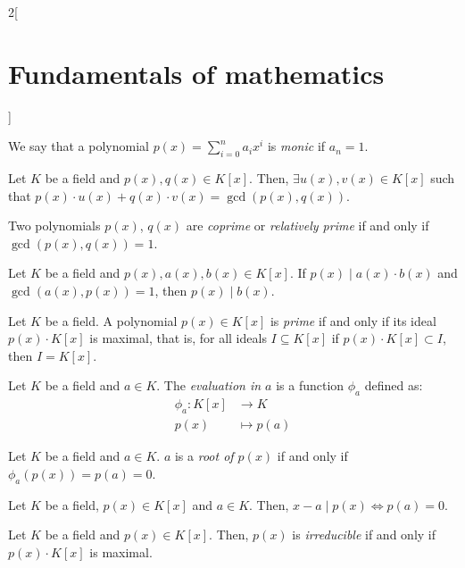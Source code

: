 \documentclass[../../../main.tex]{subfiles}
\begin{document}
\begin{multicols}{2}[\section{Fundamentals of mathematics}]
\begin{definition}
    \end{definition}
    \begin{definition}
        We say that a polynomial $p(x)=\sum_{i=0}^na_ix^i$ is \textit{monic} if $a_n=1$.
    \end{definition}
    \begin{theorem}
        Let $K$ be a field and $p(x),q(x)\in K[x]$. Then, $\exists u(x), v(x)\in K[x]$ such that $p(x)\cdot u(x)+q(x)\cdot v(x)=\gcd(p(x),q(x))$.
    \end{theorem}
    \begin{definition}
        Two polynomials $p(x)$, $q(x)$ are \textit{coprime} or \textit{relatively prime} if and only if $\gcd(p(x),q(x))=1$.
    \end{definition}
    \begin{theorem}
        Let $K$ be a field and $p(x),a(x),b(x)\in K[x]$. If $p(x)\mid a(x)\cdot b(x)$ and $\gcd(a(x),p(x))=1$, then $p(x)\mid b(x)$.
    \end{theorem}
    \begin{definition}
        Let $K$ be a field. A polynomial $p(x)\in K[x]$ is \textit{prime} if and only if its ideal $p(x)\cdot K[x]$ is maximal, that is, for all ideals $I\subseteq K[x]$ if $p(x)\cdot K[x] \subset I$, then $I=K[x]$.
    \end{definition}
    \begin{definition}
        Let $K$ be a field and $a\in K$. The \textit{evaluation in $a$} is a function $\phi_a$ defined as:
        \begin{align*}
            \phi_a:K[x]&\longrightarrow K\\
            p(x)&\longmapsto p(a)
        \end{align*}
    \end{definition}
    \begin{definition}
        Let $K$ be a field and $a\in K$. $a$ is a \textit{root of $p(x)$} if and only if $\phi_a(p(x))=p(a)=0$.
    \end{definition}
    \begin{theorem}
        Let $K$ be a field, $p(x)\in K[x]$ and $a\in K$. Then, $x-a\mid p(x)\iff p(a)=0$.
    \end{theorem}
    \begin{definition}
        Let $K$ be a field and $p(x)\in K[x]$. Then, $p(x)$ is \textit{irreducible} if and only if $p(x)\cdot K[x]$ is maximal.
    \end{definition}
    \begin{theorem}

\end{theorem}
\end{multicols}
\end{document}
